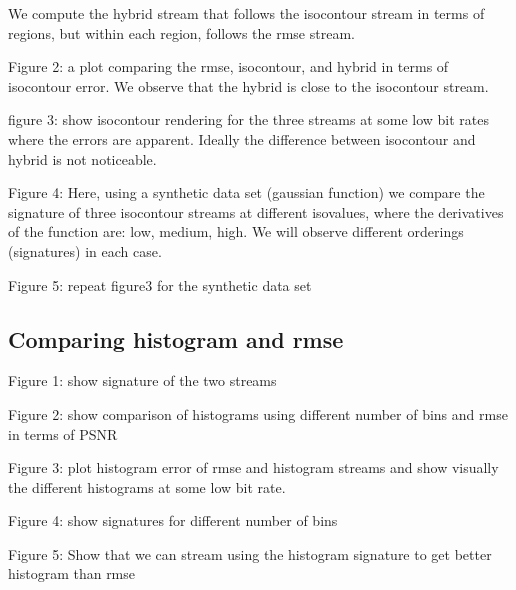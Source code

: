 We compute the hybrid stream that follows the isocontour stream in terms of regions, but within each region, follows the rmse stream.

Figure 2: a plot comparing the rmse, isocontour, and hybrid in terms of isocontour error. We observe that the hybrid is close to the isocontour stream.

figure 3: show isocontour rendering for the three streams at some low bit rates where the errors are apparent. Ideally the difference between isocontour and hybrid is not noticeable.


Figure 4:
Here, using a synthetic data set (gaussian function) we compare the signature of three isocontour streams at different isovalues, where the derivatives of the function are: low, medium, high. We will observe different orderings (signatures) in each case.

Figure 5: repeat figure3 for the synthetic data set

\subsection{Comparing histogram and rmse}
Figure 1: show signature of the two streams

Figure 2: show comparison of histograms using different number of bins and rmse in terms of PSNR

Figure 3: plot histogram error of rmse and histogram streams and show visually the different histograms at some low bit rate.

Figure 4: show signatures for different number of bins

Figure 5: Show that we can stream using the histogram signature to get better histogram than rmse